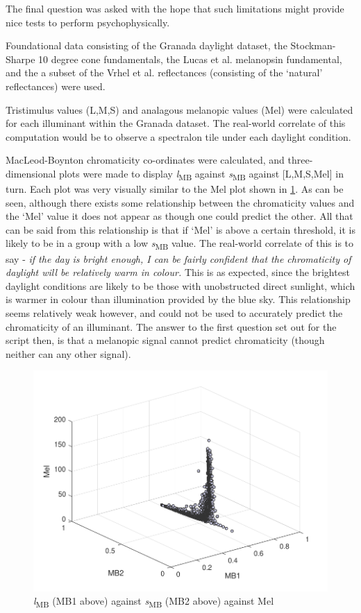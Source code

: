 \documentclass{article}
\begin{document}
The final question was asked with the hope that such limitations might provide nice tests to perform psychophysically. 

Foundational data consisting of the Granada daylight dataset, the Stockman-Sharpe 10 degree cone fundamentals, the Lucas et al. melanopsin fundamental, and the a subset of the Vrhel et al. reflectances (consisting of the `natural' reflectances) were used.

Tristimulus values (L,M,S) and analagous melanopic values (Mel) were calculated for each illuminant within the Granada dataset. The real-world correlate of this computation would be to observe a spectralon tile under each daylight condition.

MacLeod-Boynton chromaticity co-ordinates were calculated, and three-dimensional plots were made to display \textit{l}\textsubscript{MB} against \textit{s}\textsubscript{MB} against [L,M,S,Mel] in turn. Each plot was very visually similar to the Mel plot shown in \ref{fig:l1}. As can be seen, although there exists some relationship between the chromaticity values and the `Mel' value it does not appear as though one could predict the other. All that can be said from this relationship is that if `Mel' is above a certain threshold, it is likely to be in a group with a low \textit{s}\textsubscript{MB} value. The real-world correlate of this is to say - \textit{if the day is bright enough, I can be fairly confident that the chromaticity of daylight will be relatively warm in colour.} This is as expected, since the brightest daylight conditions are likely to be those with unobstructed direct sunlight, which is warmer in colour than illumination provided by the blue sky. This relationship seems relatively weak however, and could not be used to accurately predict the chromaticity of an illuminant. The answer to the first question set out for the script then, is that a melanopic signal cannot predict chromaticity (though neither can any other signal).

\begin{figure}[ht]
    \centering
    \includegraphics{figs/Level1sigs.pdf}
    \caption{\textit{l}\textsubscript{MB} (MB1 above) against \textit{s}\textsubscript{MB} (MB2 above) against Mel}
    \label{fig:l1}
\end{figure} 
\end{document}
